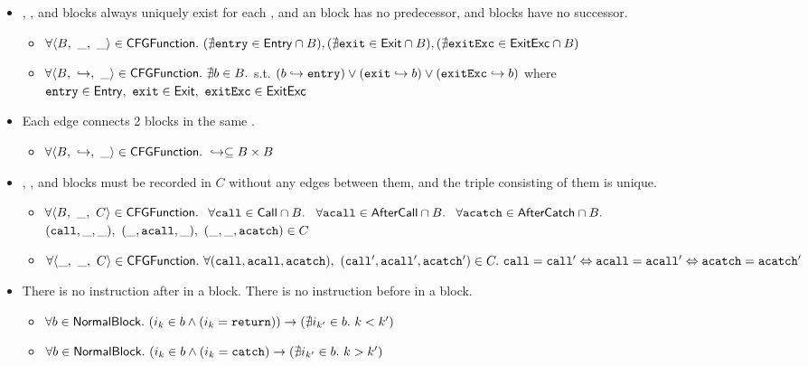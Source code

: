 \begin{itemize}
\item \Entry, \Exit, and \ExitExc blocks always uniquely exist for each \CFGFunction,
and an \Entry block has no predecessor, \Exit and \ExitExc blocks have no successor.
\begin{itemize}
\item $\forall \langle B,\ \_,\ \_ \rangle \in \mbox{\textsf{CFGFunction}}.\ (\nexists \mbox{\texttt{entry}} \in \mbox{\textsf{Entry}} \cap B), (\nexists \mbox{\texttt{exit}} \in \mbox{\textsf{Exit}} \cap B),
(\nexists \mbox{\texttt{exitExc}} \in \mbox{\textsf{ExitExc}} \cap B)$
\item $\forall \langle B,\ \hookrightarrow,\ \_ \rangle \in \CFGFunction.\ \nexists b \in B.$
s.t. $(b \hookrightarrow \mbox{\texttt{entry}}) \vee (\mbox{\texttt{exit}} \hookrightarrow b) \vee (\mbox{\texttt{exitExc}} \hookrightarrow b)$
where $\mbox{\texttt{entry}} \in \mbox{\textsf{Entry}},\ \mbox{\texttt{exit}} \in \mbox{\textsf{Exit}},\ \mbox{\texttt{exitExc}} \in \mbox{\textsf{ExitExc}}$
\end{itemize}

\item Each edge connects 2 blocks in the same \CFGFunction.
\begin{itemize}
\item $\forall \langle B,\ \hookrightarrow,\ \_ \rangle \in \CFGFunction.\ \hookrightarrow \subseteq B \times B$
\end{itemize}

\item \Call, \AfterCall, and \AfterCatch blocks must be recorded in $C$ without any edges
between them, and the triple consisting of them is unique.
\begin{itemize}
\item $\forall \langle B,\ \_,\ C \rangle \in \mbox{\textsf{CFGFunction}}.\ $
$\forall \mbox{\texttt{call}} \in \mbox{\textsf{Call}} \cap B.\ $
$\forall \mbox{\texttt{acall}} \in \mbox{\textsf{AfterCall}} \cap B.\ $
$\forall \mbox{\texttt{acatch}} \in \mbox{\textsf{AfterCatch}} \cap B.\ $
$(\mbox{\texttt{call}}, \_, \_),\ (\_, \mbox{\texttt{acall}}, \_),\ (\_, \_, \mbox{\texttt{acatch}}) \in C$
\item $\forall \langle \_,\ \_,\ C \rangle \in \mbox{\textsf{CFGFunction}}.\ \forall (\mbox{\texttt{call}}, \mbox{\texttt{acall}}, \mbox{\texttt{acatch}}),\ (\mbox{\texttt{call}}', \mbox{\texttt{acall}}', \mbox{\texttt{acatch}}') \in C.\ \mbox{\texttt{call}} = \mbox{\texttt{call}}' \Leftrightarrow \mbox{\texttt{acall}} = \mbox{\texttt{acall}}' \Leftrightarrow \mbox{\texttt{acatch}} = \mbox{\texttt{acatch}}'$
\end{itemize}

\item There is no instruction after  in a block. There is no instruction before  in a block.
\begin{itemize}
\item $\forall b \in \mbox{\textsf{NormalBlock}}.\ (i_k \in b \wedge (i_k = \mbox{\texttt{return}})) \rightarrow (\nexists i_{k'} \in b.\ k < k')$
\item $\forall b \in \mbox{\textsf{NormalBlock}}.\ (i_k \in b \wedge (i_k = \mbox{\texttt{catch}}) \rightarrow (\nexists i_{k'} \in b.\ k > k')$
\end{itemize}

\end{itemize}
\newpage



